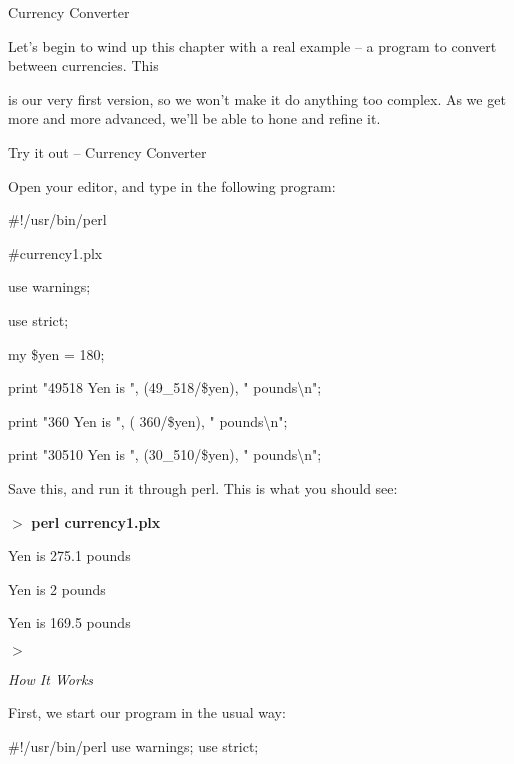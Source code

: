 \documentclass[a4paper,11pt]{book}
\begin{document}
\noindent 

\noindent Currency Converter

\noindent 

\noindent Let's begin to wind up this chapter with a real example -- a program to convert between currencies. This

\noindent is our very first version, so we won't make it do anything too complex. As we get more and more advanced, we'll be able to hone and refine it.

\noindent 

\noindent Try it out -- Currency Converter

\noindent 

\noindent Open your editor, and type in the following program:

\noindent 

\noindent \#!/usr/bin/perl

\noindent \#currency1.plx

\noindent use warnings;

\noindent use strict;

\noindent my \$yen = 180;

\noindent print "49518 Yen is ", (49\_518/\$yen), " pounds\textbackslash n";

\noindent print "360 Yen is ", ( 360/\$yen), " pounds\textbackslash n";

\noindent print "30510 Yen is ", (30\_510/\$yen), " pounds\textbackslash n";

\noindent 

\noindent Save this, and run it through perl. This is what you should see:

\noindent 

\noindent $>$ \textbf{perl currency1.plx}

 Yen is 275.1 pounds

 Yen is 2 pounds

 Yen is 169.5 pounds

\noindent $>$

\noindent 

\noindent 

\noindent \textit{How It Works}

\noindent First, we start our program in the usual way:

\noindent 

\noindent \#!/usr/bin/perl use warnings; use strict;

\noindent 
\end{document}
